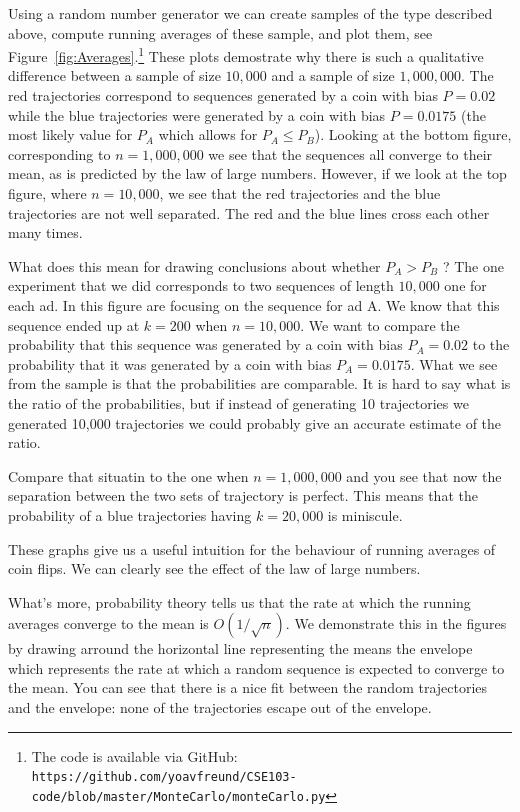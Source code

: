 \documentclass{report}
\theoremstyle{plain}
\theoremstyle{definition}
\begin{document}
Using a random number generator we can create samples of the type
described above, compute running averages of these sample, and plot
them, see Figure~\ref{fig:Averages}.\footnote{The code is available
  via GitHub: {\tt
    https://github.com/yoavfreund/CSE103-code/blob/master/MonteCarlo/monteCarlo.py}}
These plots demostrate why there is such a qualitative difference
between a sample of size $10,000$ and a sample of size
$1,000,000$. The red trajectories correspond to sequences generated by
a coin with bias $P=0.02$ while the blue trajectories were generated
by a coin with bias $P=0.0175$ (the most likely value for $P_A$ which
allows for $P_A \leq P_B$). Looking at the bottom figure,
corresponding to $n=1,000,000$ we see that the sequences all converge
to their mean, as is predicted by the law of large numbers. However,
if we look at the top figure, where $n=10,000$, we see that the red
trajectories and the blue trajectories are not well separated. The red
and the blue lines cross each other many times.

What does this mean for drawing conclusions about whether $P_A>P_B$ ?
The one experiment that we did corresponds to two sequences of length
$10,000$ one for each ad. In this figure are focusing on the sequence
for ad A. We know that this sequence ended up at $k=200$ when
$n=10,000$. We want to compare the probability that this sequence was
generated by a coin with bias $P_A=0.02$ to the probability that it
was generated by a coin with bias $P_A=0.0175$. What we see from the
sample is that the probabilities are comparable. It is hard to say
what is the ratio of the probabilities, but if instead of generating
10 trajectories we generated 10,000 trajectories we could probably
give an accurate estimate of the ratio.

Compare that situatin to the one when $n=1,000,000$ and you see that
now the separation between the two sets of trajectory is perfect. This
means that the probability of a blue trajectories having $k=20,000$ is
miniscule.

These graphs give us a useful intuition for the behaviour of running
averages of coin flips. We can clearly see the effect of the law of
large numbers.

What's more, probability theory tells us that the rate at which the
running averages converge to the mean is $O(1/\sqrt{n})$. We
demonstrate this in the figures by drawing arround the horizontal line
representing the means the envelope which represents the rate at which
a random sequence is expected to converge to the mean. You can see
that there is a nice fit between the random trajectories and the
envelope: none of the trajectories escape out of the envelope.
\end{document}
